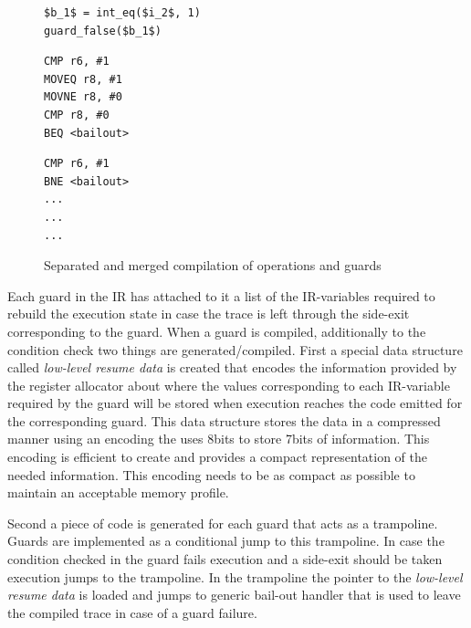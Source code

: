 \documentclass[10pt,preprint]{sigplanconf}
\newcommand\bivab[1]{\nb{DAVID}{#1}}
\begin{document}
\bivab{Figure needs better formatting}
\begin{figure}[ht]
  \noindent
  \centering
  \begin{minipage}{1\columnwidth}
    \begin{lstlisting}[mathescape]
$b_1$ = int_eq($i_2$, 1)
guard_false($b_1$)
    \end{lstlisting}
  \end{minipage}
  \begin{minipage}{.40\columnwidth}
    \begin{lstlisting}
CMP r6, #1
MOVEQ r8, #1
MOVNE r8, #0
CMP r8, #0
BEQ <bailout>
    \end{lstlisting}
  \end{minipage}
  \hfill
  \begin{minipage}{.40\columnwidth}
    \begin{lstlisting}
CMP r6, #1
BNE <bailout>
...
...
...
    \end{lstlisting}
  \end{minipage}
  \caption{Separated and merged compilation of operations and guards}
  \label{fig:trace-compiled}
\end{figure}

Each guard in the IR has attached to it a list of the IR-variables required to
rebuild the execution state in case the trace is left through the side-exit
corresponding to the guard. When a guard is compiled, additionally to the
condition check two things are generated/compiled. First a special data
structure called \emph{low-level resume data} is created that encodes the
information provided by the register allocator about where the values
corresponding to each IR-variable required by the guard will be stored when
execution reaches the code emitted for the corresponding guard. This data
structure stores the data in a compressed manner using an encoding the uses
8bits to store 7bits of information. This encoding is efficient to create and
provides a compact representation of the needed information. This encoding
needs to be as compact as possible to maintain an acceptable memory profile.

Second a piece of code is generated for each guard that acts as a trampoline.
Guards are implemented as a conditional jump to this trampoline. In case the
condition checked in the guard fails execution and a side-exit should be taken
execution jumps to the trampoline. In the trampoline the pointer to the
\emph{low-level resume data} is loaded and jumps to generic bail-out handler
that is used to leave the compiled trace in case of a guard failure.
\end{document}
